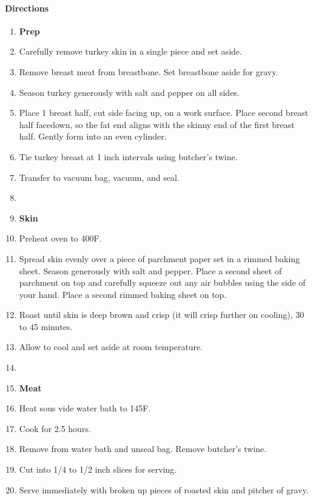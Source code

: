 \documentclass[12pt]{article}
\newenvironment*{directions}
	{
		\paragraph*{Directions}
		\begin{enumerate}
	}
	{
		\end{enumerate}
	}
\begin{document}
	\begin{directions}
		\item[] \textbf{Prep}
		\item Carefully remove turkey skin in a single piece and set aside.
		\item Remove breast meat from breastbone. Set breastbone aside for gravy.
		\item Season turkey generously with salt and pepper on all sides.
		\item Place 1 breast half, cut side facing up, on a work surface. Place second breast half facedown, so the fat end aligns with the skinny end of the first breast half. Gently form into an even cylinder.
		\item Tie turkey breast at 1 inch intervals using butcher's twine.
		\item Transfer to vacuum bag, vacuum, and seal.
		\item[] \hfill
		\item[] \textbf{Skin}
		\item Preheat oven to 400F.
		\item Spread skin evenly over a piece of parchment paper set in a rimmed baking sheet. Season generously with salt and pepper. Place a second sheet of parchment on top and carefully squeeze out any air bubbles using the side of your hand. Place a second rimmed baking sheet on top.
		\item Roast until skin is deep brown and crisp (it will crisp further on cooling), 30 to 45 minutes.
		\item Allow to cool and set aside at room temperature. \label{make_ahead:turkey_sous_vide}
		\item[] \hfill
		\item[] \textbf{Meat}
		\item Heat sous vide water bath to 145F.
		\item Cook for 2.5 hours.
		\item Remove from water bath and unseal bag. Remove butcher's twine.
		\item Cut into 1/4 to 1/2 inch slices for serving.
		\item Serve immediately with broken up pieces of roasted skin and pitcher of gravy.
	\end{directions}
	
\end{document}
